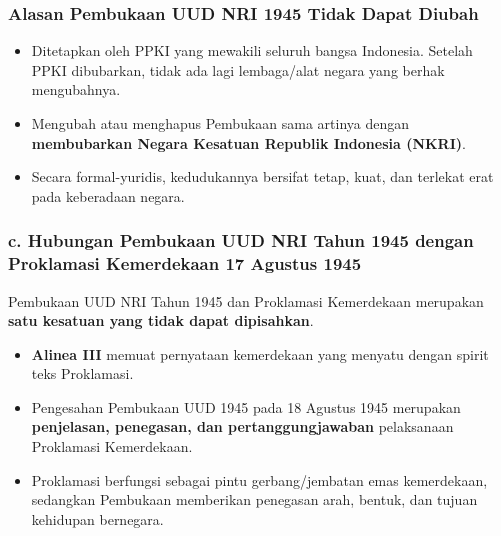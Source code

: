 \subsubsection{Alasan Pembukaan UUD NRI 1945 Tidak Dapat Diubah}
\begin{itemize}
    \item Ditetapkan oleh PPKI yang mewakili seluruh bangsa Indonesia. Setelah PPKI dibubarkan, tidak ada lagi lembaga/alat negara yang berhak mengubahnya.
    \item Mengubah atau menghapus Pembukaan sama artinya dengan \textbf{membubarkan Negara Kesatuan Republik Indonesia (NKRI)}.
    \item Secara formal-yuridis, kedudukannya bersifat tetap, kuat, dan terlekat erat pada keberadaan negara.
\end{itemize}


\subsubsection{c. Hubungan Pembukaan UUD NRI Tahun 1945 dengan Proklamasi Kemerdekaan 17 Agustus 1945}
Pembukaan UUD NRI Tahun 1945 dan Proklamasi Kemerdekaan merupakan \textbf{satu kesatuan yang tidak dapat dipisahkan}.

\begin{itemize}
    \item \textbf{Alinea III} memuat pernyataan kemerdekaan yang menyatu dengan spirit teks Proklamasi.
    \item Pengesahan Pembukaan UUD 1945 pada 18 Agustus 1945 merupakan \textbf{penjelasan, penegasan, dan pertanggungjawaban} pelaksanaan Proklamasi Kemerdekaan.
    \item Proklamasi berfungsi sebagai pintu gerbang/jembatan emas kemerdekaan, sedangkan Pembukaan memberikan penegasan arah, bentuk, dan tujuan kehidupan bernegara.
\end{itemize}


